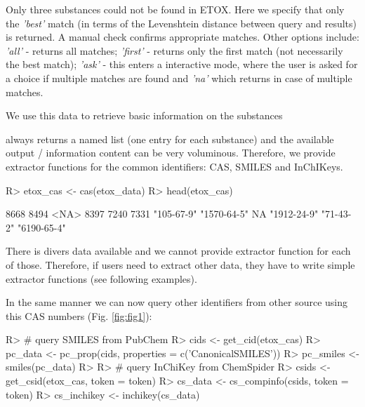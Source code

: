 \documentclass[article, shortnames]{jss}\usepackage[]{graphicx}\usepackage[]{color}
\begin{document}
Only three substances could not be found in ETOX. 
Here we specify that only the \emph{'best'} match (in terms of the Levenshtein distance between query and results) is returned. 
A manual check confirms appropriate matches. 
Other options include: \emph{'all'} - returns all matches; \emph{'first'} - returns only the first match (not necessarily the best match); \emph{'ask'} - this enters a interactive mode, where the user is asked for a choice if multiple matches are found and \emph{'na'} which returns  in case of multiple matches.

We use this data to retrieve basic information on the substances

\begin{CodeChunk}
\end{CodeChunk}

 always returns a named list (one entry for each substance) and the available output / information content can be very voluminous.
Therefore, we provide extractor functions for the common identifiers: CAS, SMILES and InChIKeys.
\begin{CodeChunk}
\begin{CodeInput}
R> etox_cas <- cas(etox_data)
R> head(etox_cas)
\end{CodeInput}
\begin{CodeOutput}
       8668        8494        <NA>        8397        7240        7331 
 "105-67-9" "1570-64-5"          NA "1912-24-9"   "71-43-2" "6190-65-4" 
\end{CodeOutput}
\end{CodeChunk}

There is divers data available and we cannot provide extractor function for each of those.
Therefore, if users need to extract other data, they have to write simple extractor functions (see following examples).

In the same manner we can now query other identifiers from other source using this CAS numbers (Fig. \ref{fig:fig1}):


\begin{CodeChunk}
\begin{CodeInput}
R> # query SMILES from PubChem
R> cids <- get_cid(etox_cas)
R> pc_data <- pc_prop(cids, properties = c('CanonicalSMILES'))
R> pc_smiles <- smiles(pc_data)
R> 
R> # query InChiKey from ChemSpider
R> csids <- get_csid(etox_cas, token = token)
R> cs_data <- cs_compinfo(csids, token = token)
R> cs_inchikey <- inchikey(cs_data)
\end{CodeInput}
\end{CodeChunk}
\end{document}
